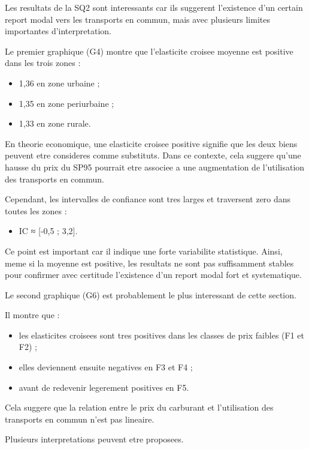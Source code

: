 \documentclass[
]{article}
\providecommand{\tightlist}{%
  \setlength{\itemsep}{0pt}\setlength{\parskip}{0pt}}
\begin{document}
Les resultats de la SQ2 sont interessants car ils suggerent l'existence
d'un certain report modal vers les transports en commun, mais avec
plusieurs limites importantes d'interpretation.

Le premier graphique (G4) montre que l'elasticite croisee moyenne est
positive dans les trois zones :

\begin{itemize}
\tightlist
\item
  1,36 en zone urbaine ;
\item
  1,35 en zone periurbaine ;
\item
  1,33 en zone rurale.
\end{itemize}

En theorie economique, une elasticite croisee positive signifie que les
deux biens peuvent etre consideres comme substituts. Dans ce contexte,
cela suggere qu'une hausse du prix du SP95 pourrait etre associee a une
augmentation de l'utilisation des transports en commun.

Cependant, les intervalles de confiance sont tres larges et traversent
zero dans toutes les zones :

\begin{itemize}
\tightlist
\item
  IC ≈ {[}-0,5 ; 3,2{]}.
\end{itemize}

Ce point est important car il indique une forte variabilite statistique.
Ainsi, meme si la moyenne est positive, les resultats ne sont pas
suffisamment stables pour confirmer avec certitude l'existence d'un
report modal fort et systematique.

Le second graphique (G6) est probablement le plus interessant de cette
section.

Il montre que :

\begin{itemize}
\tightlist
\item
  les elasticites croisees sont tres positives dans les classes de prix
  faibles (F1 et F2) ;
\item
  elles deviennent ensuite negatives en F3 et F4 ;
\item
  avant de redevenir legerement positives en F5.
\end{itemize}

Cela suggere que la relation entre le prix du carburant et l'utilisation
des transports en commun n'est pas lineaire.

Plusieurs interpretations peuvent etre proposees.
\end{document}
